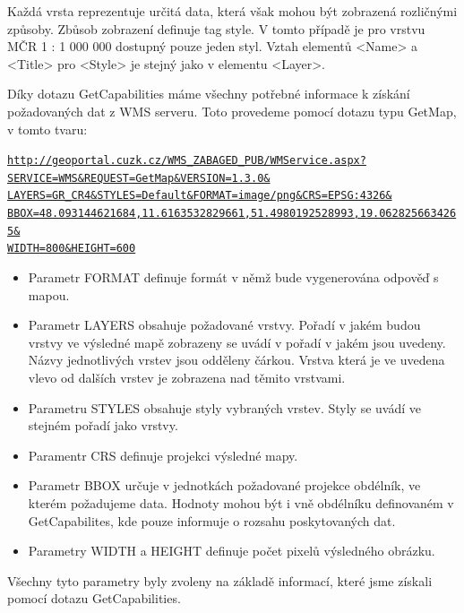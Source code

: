 \documentclass[a4paper,12pt]{article}
\begin{document}
Každá vrsta reprezentuje určitá data, která však mohou být zobrazená rozličnými způsoby. Zbůsob zobrazení definuje tag style. V tomto případě  je pro vrstvu MČR 1 : 1 000 000 
dostupný pouze jeden styl. Vztah elementů <Name> a <Title> pro <Style> je stejný jako v elementu <Layer>.

Díky dotazu GetCapabilities máme všechny potřebné informace k získání požadovaných dat z WMS serveru. 
Toto provedeme pomocí dotazu typu GetMap, v tomto tvaru:



\newcommand{\CUZKgetMap}{http://geoportal.cuzk.cz/WMS_ZABAGED_PUB/WMService.aspx?SERVICE=WMS&REQUEST=GetMap&VERSION=1.3.0&LAYERS=GR_CR4&STYLES=Default&FORMAT=image/png&CRS=EPSG:4326&BBOX=48.093144621684,11.6163532829661,51.4980192528993,19.0628256634265&WIDTH=800&HEIGHT=600}
\begin{alltt}\footnotesize
\href{\CUZKgetMap}{http://geoportal.cuzk.cz/WMS\_ZABAGED\_PUB/WMService.aspx?}
\href{\CUZKgetMap}{SERVICE=WMS\&REQUEST=GetMap\&VERSION=1.3.0\&}
\href{\CUZKgetMap}{LAYERS=GR\_CR4\&STYLES=Default\&FORMAT=image/png\&CRS=EPSG:4326\&}
\href{\CUZKgetMap}{BBOX=48.093144621684,11.6163532829661,51.4980192528993,19.0628256634265\&}
\href{\CUZKgetMap}{WIDTH=800\&HEIGHT=600}
\end{alltt}


\begin{itemize}
  \item Parametr FORMAT definuje formát v němž bude vygenerována odpověď s mapou. 
  \item Parametr LAYERS obsahuje požadované vrstvy. Pořadí v jakém budou vrstvy ve výsledné mapě zobrazeny se uvádí v pořadí v jakém jsou uvedeny. Názvy jednotlivých vrstev 
        jsou odděleny čárkou. Vrstva která je ve uvedena vlevo od dalších vrstev je zobrazena nad těmito vrstvami.
  \item Parametru STYLES obsahuje styly vybraných vrstev. Styly se uvádí ve stejném pořadí jako vrstvy.    
  \item Paramentr CRS definuje projekci výsledné mapy. 
  \item Parametr BBOX určuje v jednotkách požadované projekce obdélník, ve kterém požadujeme data. Hodnoty mohou být i vně obdélníku definovaném v GetCapabilites,
	kde pouze informuje o rozsahu poskytovaných dat.  
  \item Parametry WIDTH a HEIGHT definuje počet pixelů výsledného obrázku. 
\end{itemize}

Všechny tyto parametry byly zvoleny na základě informací, které jsme získali pomocí dotazu GetCapabilities. 
\end{document}
